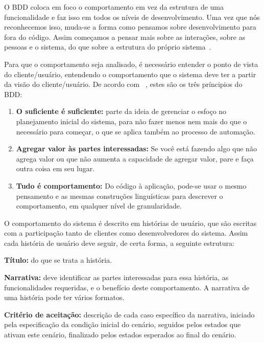 O BDD coloca em foco o comportamento em vez da estrutura de uma funcionalidade e faz isso em todos os níveis de desenvolvimento. Uma vez que nós reconhecemos isso, muda-se a forma como pensamos sobre desenvolvimento para fora do código. Assim começamos a pensar mais sobre as interações, sobre as pessoas e o sistema, do que sobre a 
estrutura do próprio sistema~\cite{chelimsky2010}.

Para que o comportamento seja analisado, é necessário entender o ponto de vista do 
cliente/usuário, entendendo o comportamento que o sistema deve ter a partir da
visão do cliente/usuário. 
%
De acordo com ~, estes são os três príncipios do BDD:

\begin{enumerate}
\item \textbf{O suficiente é suficiente:} parte da ideia de gerenciar o esfoço no 
planejamento inicial do sistema, para não fazer menos nem mais do que o necessário 
para começar, o que se aplica também ao processo de automação.

\item \textbf{Agregar valor às partes interessadas:} Se você está fazendo algo que 
não agrega valor ou que não aumenta a capacidade de agregar valor, pare e faça outra 
coisa em seu lugar.

\item \textbf{Tudo é comportamento:} Do código à aplicação, pode-se usar o mesmo 
pensamento e as mesmas construções linguísticas para descrever o comportamento, em 
qualquer nível de granularidade. 
\end{enumerate}

O comportamento do sistema é descrito em histórias de usuário, que são 
escritas com a participação tanto de clientes como desemvolvedores do sistema. Assim 
cada história de usuário deve seguir, de certa forma, a seguinte estrutura:

\textbf{Título:} do que se trata a história.

\textbf{Narrativa:} deve identificar as partes interessadas para essa história, as 
funcionalidades requeridas, e o benefício deste comportamento. A narrativa de uma 
história pode ter vários formatos.

\textbf{Critério de aceitação:} descrição de cada caso específico da narrativa, 
iniciado pela especificação da condição inicial do cenário, seguidos pelos estados 
que ativam este cenário, finalizado pelos estados esperados ao final do cenário.


